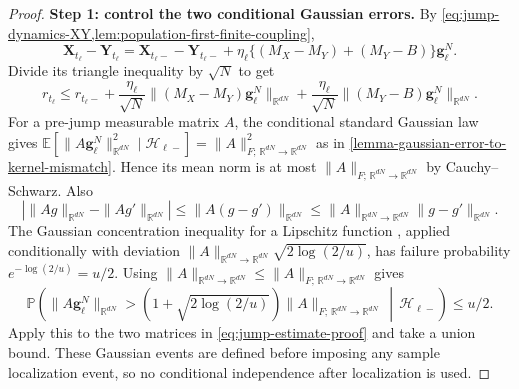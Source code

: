 \begin{proof}
\noindent\textbf{Step 1: control the two conditional Gaussian errors.}
By \cref{eq:jump-dynamics-XY,lem:population-first-finite-coupling},
\[
 \mathbf X_{t_\ell}-\mathbf Y_{t_\ell}
 =\mathbf X_{t_\ell-}-\mathbf Y_{t_\ell-}
   +\eta_\ell\{(M_X-M_Y)+(M_Y-B)\}\mathbf g_\ell^N.
\]
Divide its triangle inequality by $\sqrt N$ to get
\begin{equation}
\label{eq:jump-estimate-proof}
r_{t_\ell}\le r_{t_\ell-}
+\frac{\eta_\ell}{\sqrt N}\|(M_X-M_Y)\mathbf g_\ell^N\|_{\mathbb R^{dN}}
+\frac{\eta_\ell}{\sqrt N}\|(M_Y-B)\mathbf g_\ell^N\|_{\mathbb R^{dN}}.
\end{equation}
For a pre-jump measurable matrix $A$, the conditional standard Gaussian
law gives $\mathbb E[\|A\mathbf g_\ell^N\|_{\mathbb R^{dN}}^2\mid\mathcal H_{\ell-}]
=\|A\|_{F;\,\mathbb R^{dN}\to\mathbb R^{dN}}^2$ as in \cref{lemma-gaussian-error-to-kernel-mismatch}.
Hence its mean norm is at most $\|A\|_{F;\,\mathbb R^{dN}\to\mathbb R^{dN}}$ by Cauchy--Schwarz. Also
\[
 |\|Ag\|_{\mathbb R^{dN}}-\|Ag'\|_{\mathbb R^{dN}}|\le\|A(g-g')\|_{\mathbb R^{dN}}
 \le\|A\|_{\mathbb R^{dN}\to\mathbb R^{dN}}\|g-g'\|_{\mathbb R^{dN}}.
\]
The Gaussian concentration inequality for a Lipschitz function
\citep{BLM2013}, applied conditionally with deviation
$\|A\|_{\mathbb R^{dN}\to\mathbb R^{dN}}\sqrt{2\log(2/u)}$, has failure probability
$e^{-\log(2/u)}=u/2$. Using $\|A\|_{\mathbb R^{dN}\to\mathbb R^{dN}}\le\|A\|_{F;\,\mathbb R^{dN}\to\mathbb R^{dN}}$ gives
\[
\mathbb P\!\left(\|A\mathbf g_\ell^N\|_{\mathbb R^{dN}}>
(1+\sqrt{2\log(2/u)})\|A\|_{F;\,\mathbb R^{dN}\to\mathbb R^{dN}}\,\middle|\,\mathcal H_{\ell-}\right)\le u/2.
\]
Apply this to the two matrices in \eqref{eq:jump-estimate-proof} and take
a union bound. These Gaussian events are defined before imposing any sample
localization event, so no conditional independence after localization is used.



\end{proof}
